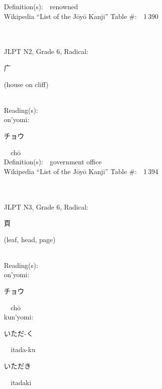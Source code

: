 \begin{multicols}{2}
Definition(s):\ \ renowned \\
Wikipedia ``List of the J\=oy\=o Kanji'' Table \#:\ \ 1\,390 \\
\ \ \\
{\fontsize{34pt}{40pt}  }\ \ \\  %
{JLPT N2, Grade 6, Radical:\ \ {\begin{CJK}{UTF8}{min} 广 \end{CJK}} (house on cliff) } \\
Reading(s):\ \ \\
{\hspace*{1em}}on'yomi:\ \ \\
{\hspace*{2em}}{\begin{CJK}{UTF8}{min} チョウ \end{CJK}}\ \ ch\=o\ \ \\
Definition(s):\ \ government office \\
Wikipedia ``List of the J\=oy\=o Kanji'' Table \#:\ \ 1\,394 \\
\ \ \\
{\fontsize{34pt}{40pt}  }\ \ \\  %
{JLPT N3, Grade 6, Radical:\ \ {\begin{CJK}{UTF8}{min} 頁 \end{CJK}} (leaf, head, page) } \\
Reading(s):\ \ \\
{\hspace*{1em}}on'yomi:\ \ \\
{\hspace*{2em}}{\begin{CJK}{UTF8}{min} チョウ \end{CJK}}\ \ ch\=o\ \ \\
{\hspace*{1em}}kun'yomi:\ \ \\
{\hspace*{2em}}{\begin{CJK}{UTF8}{min} いただ-く \end{CJK}}\ \ itada-ku\ \ \\
{\hspace*{2em}}{\begin{CJK}{UTF8}{min} いただき \end{CJK}}\ \ itadaki\ \ \\

\end{multicols}
